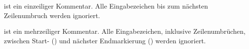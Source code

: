  ist ein einzeiliger Kommentar. Alle Eingabezeichen bis zum nächsten Zeilenumbruch
werden ignoriert.

 ist ein mehrzeiliger Kommentar. Alle Eingabezeichen, inklusive Zeilenumbrüchen,
zwischen Start- (\kwMlcStart) und nächster Endmarkierung (\kwMlcEnd) werden ignoriert.

